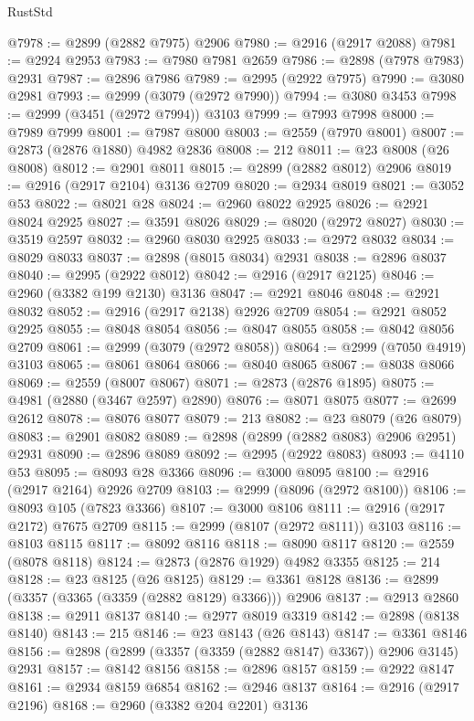 \begin{lexlean}{RustStd}
\begin{coremodule}
@7978 := @2899 (@2882 @7975) @2906
@7980 := @2916 (@2917 @2088)
@7981 := @2924 @2953
@7983 := @7980 @7981 @2659
@7986 := @2898 (@7978 @7983) @2931
@7987 := @2896 @7986
@7989 := @2995 (@2922 @7975)
@7990 := @3080 @2981
@7993 := @2999 (@3079 (@2972 @7990))
@7994 := @3080 @3453
@7998 := @2999 (@3451 (@2972 @7994)) @3103
@7999 := @7993 @7998
@8000 := @7989 @7999
@8001 := @7987 @8000
@8003 := @2559 (@7970 @8001)
@8007 := @2873 (@2876 @1880) @4982 @2836
@8008 := 212
@8011 := @23 @8008 (@26 @8008)
@8012 := @2901 @8011
@8015 := @2899 (@2882 @8012) @2906
@8019 := @2916 (@2917 @2104) @3136 @2709
@8020 := @2934 @8019
@8021 := @3052 @53
@8022 := @8021 @28
@8024 := @2960 @8022 @2925
@8026 := @2921 @8024 @2925
@8027 := @3591 @8026
@8029 := @8020 (@2972 @8027)
@8030 := @3519 @2597
@8032 := @2960 @8030 @2925
@8033 := @2972 @8032
@8034 := @8029 @8033
@8037 := @2898 (@8015 @8034) @2931
@8038 := @2896 @8037
@8040 := @2995 (@2922 @8012)
@8042 := @2916 (@2917 @2125)
@8046 := @2960 (@3382 @199 @2130) @3136
@8047 := @2921 @8046
@8048 := @2921 @8032
@8052 := @2916 (@2917 @2138) @2926 @2709
@8054 := @2921 @8052 @2925
@8055 := @8048 @8054
@8056 := @8047 @8055
@8058 := @8042 @8056 @2709
@8061 := @2999 (@3079 (@2972 @8058))
@8064 := @2999 (@7050 @4919) @3103
@8065 := @8061 @8064
@8066 := @8040 @8065
@8067 := @8038 @8066
@8069 := @2559 (@8007 @8067)
@8071 := @2873 (@2876 @1895)
@8075 := @4981 (@2880 (@3467 @2597) @2890)
@8076 := @8071 @8075
@8077 := @2699 @2612
@8078 := @8076 @8077
@8079 := 213
@8082 := @23 @8079 (@26 @8079)
@8083 := @2901 @8082
@8089 := @2898 (@2899 (@2882 @8083) @2906 @2951) @2931
@8090 := @2896 @8089
@8092 := @2995 (@2922 @8083)
@8093 := @4110 @53
@8095 := @8093 @28 @3366
@8096 := @3000 @8095
@8100 := @2916 (@2917 @2164) @2926 @2709
@8103 := @2999 (@8096 (@2972 @8100))
@8106 := @8093 @105 (@7823 @3366)
@8107 := @3000 @8106
@8111 := @2916 (@2917 @2172) @7675 @2709
@8115 := @2999 (@8107 (@2972 @8111)) @3103
@8116 := @8103 @8115
@8117 := @8092 @8116
@8118 := @8090 @8117
@8120 := @2559 (@8078 @8118)
@8124 := @2873 (@2876 @1929) @4982 @3355
@8125 := 214
@8128 := @23 @8125 (@26 @8125)
@8129 := @3361 @8128
@8136 := @2899 (@3357 (@3365 (@3359 (@2882 @8129) @3366))) @2906
@8137 := @2913 @2860
@8138 := @2911 @8137
@8140 := @2977 @8019 @3319
@8142 := @2898 (@8138 @8140)
@8143 := 215
@8146 := @23 @8143 (@26 @8143)
@8147 := @3361 @8146
@8156 := @2898 (@2899 (@3357 (@3359 (@2882 @8147) @3367)) @2906 @3145) @2931
@8157 := @8142 @8156
@8158 := @2896 @8157
@8159 := @2922 @8147
@8161 := @2934 @8159 @6854
@8162 := @2946 @8137
@8164 := @2916 (@2917 @2196)
@8168 := @2960 (@3382 @204 @2201) @3136

\end{coremodule}
\end{lexlean}

